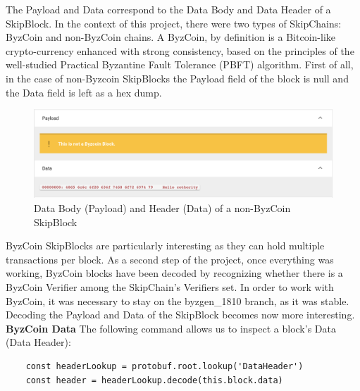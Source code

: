 \documentclass[11pt, a4paper, twoside, openright]{article} %
\begin{document}
{The Payload and Data correspond to the Data Body and Data Header of a SkipBlock. 
In the context of this project, there were two types of SkipChains: ByzCoin and non-ByzCoin chains.
A ByzCoin, by definition \cite{Byzcoin} is a Bitcoin-like crypto-currency enhanced with strong consistency, based on the principles of the well-studied Practical Byzantine Fault Tolerance (PBFT) \cite{BFT} algorithm. 
First of all, in the case of non-Byzcoin SkipBlocks the Payload field of the block is null and the Data field is left as a hex dump. 
\begin{figure}[h]
    \centering
    \includegraphics[width=\textwidth]{nonByzcoin.png}
    \caption{Data Body (Payload) and Header (Data) of a non-ByzCoin SkipBlock}
\end{figure}
\newpage
ByzCoin SkipBlocks are particularly interesting as they can hold multiple transactions per block.
As a second step of the project, once everything was working,  ByzCoin blocks have been decoded by recognizing whether there is a ByzCoin Verifier among the SkipChain's Verifiers set.
In order to work with ByzCoin, it was necessary to stay on the byzgen\_1810 branch, as it was stable. Decoding the Payload and Data of the SkipBlock becomes now more interesting.
\newline
\newline
\textbf{ByzCoin Data}
\newline
\newline
The following command allows us to inspect a block's Data (Data Header):
\begin{lstlisting}
    const headerLookup = protobuf.root.lookup('DataHeader')
    const header = headerLookup.decode(this.block.data)
\end{lstlisting}


}
\end{document}
